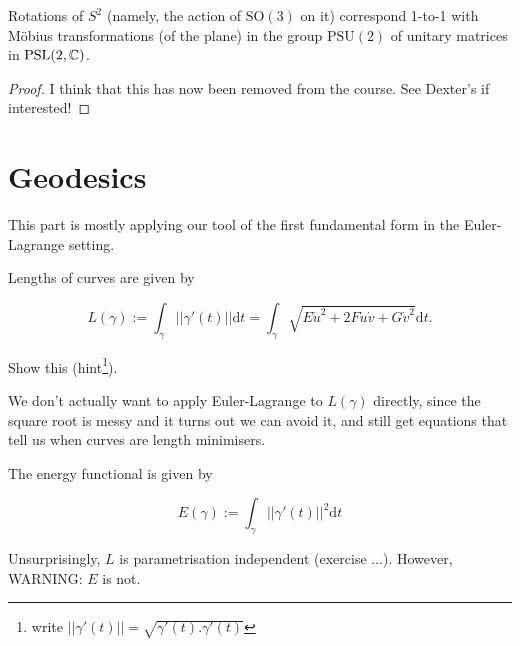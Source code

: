 \documentclass[11pt]{scrartcl}
\begin{document}
\begin{proposition}
Rotations of $S^2$ (namely, the action of $\text{SO}(3)$ on it) correspond 1-to-1 with M{\"o}bius transformations (of the plane) in the group $\text{PSU}(2)$ of unitary matrices in $\text{PSL}(2, \mathbb C)$.

\begin{proof}
    I think that this has now been removed from the course. See Dexter's if interested!
\end{proof}
\end{proposition}

\section{Geodesics}

This part is mostly applying our tool of the first fundamental form in the Euler-Lagrange setting.

\begin{proposition}

Lengths of curves are given by

\begin{equation}
L(\gamma) := \int_\gamma ||\gamma'(t)|| \mathrm{d}t = \int_\gamma \sqrt{E\dot{u}^2 + 2F\dot{u}\dot{v} + G\dot{v}^2} \mathrm{d}t.
\end{equation}
\end{proposition}

\begin{exercise}
Show this (hint\footnote{write $||\gamma'(t)|| = \sqrt{\gamma'(t) . \gamma'(t)}$}).
\end{exercise}

We don't actually want to apply Euler-Lagrange to $L(\gamma)$ directly, since the square root is messy and it turns out we can avoid it, and still get equations that tell us when curves are length minimisers.

\begin{definition}
[Energy]

The energy functional is given by

\begin{equation}
    E(\gamma) := \int_\gamma ||\gamma'(t)||^2 \mathrm{d}t
\end{equation}
\end{definition}

\begin{remark}
Unsurprisingly, $L$ is parametrisation independent (exercise ...). However, WARNING: $E$ is not.
\end{remark}
\end{document}
